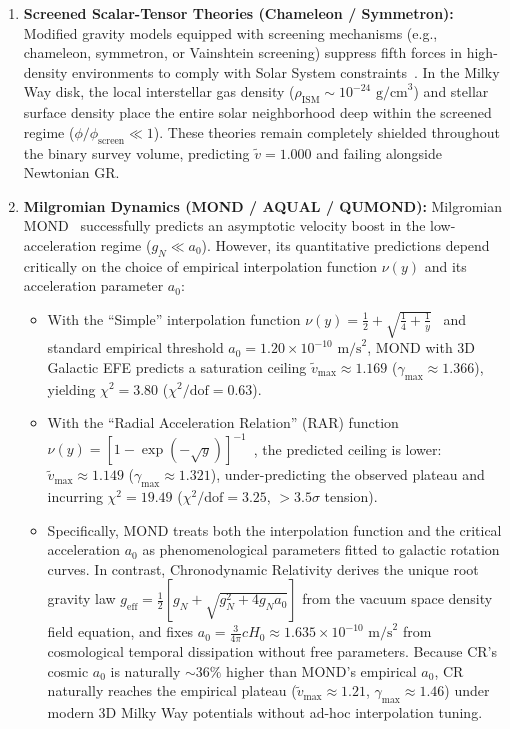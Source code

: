 \documentclass[aps,prd,reprint,superscriptaddress,nofootinbib,floatfix,amsmath,amssymb]{revtex4-2}
\begin{document}
\begin{enumerate}
\item \textbf{Screened Scalar-Tensor Theories (Chameleon / Symmetron):}
Modified gravity models equipped with screening mechanisms (e.g., chameleon, symmetron, or Vainshtein screening) suppress fifth forces in high-density environments to comply with Solar System constraints~\cite{clifton2012modified}. In the Milky Way disk, the local interstellar gas density ($\rho_{\text{ISM}} \sim 10^{-24}\text{ g/cm}^3$) and stellar surface density place the entire solar neighborhood deep within the screened regime ($\phi / \phi_{\text{screen}} \ll 1$). These theories remain completely shielded throughout the binary survey volume, predicting $\tilde{v} = 1.000$ and failing alongside Newtonian GR.

\item \textbf{Milgromian Dynamics (MOND / AQUAL / QUMOND):}
Milgromian MOND~\cite{milgrom1983modification} successfully predicts an asymptotic velocity boost in the low-acceleration regime ($g_N \ll a_0$). However, its quantitative predictions depend critically on the choice of empirical interpolation function $\nu(y)$ and its acceleration parameter $a_0$:
\begin{itemize}
\item With the ``Simple'' interpolation function $\nu(y) = \frac{1}{2} + \sqrt{\frac{1}{4} + \frac{1}{y}}$~\cite{famaey2005modified} and standard empirical threshold $a_0 = 1.20 \times 10^{-10}\text{ m/s}^2$, MOND with 3D Galactic EFE predicts a saturation ceiling $\tilde{v}_{\text{max}} \approx 1.169$ ($\gamma_{\text{max}} \approx 1.366$), yielding $\chi^2 = 3.80$ ($\chi^2/\text{dof} = 0.63$).
\item With the ``Radial Acceleration Relation'' (RAR) function $\nu(y) = [1 - \exp(-\sqrt{y})]^{-1}$~\cite{mcgaugh2016radial}, the predicted ceiling is lower: $\tilde{v}_{\text{max}} \approx 1.149$ ($\gamma_{\text{max}} \approx 1.321$), under-predicting the observed plateau and incurring $\chi^2 = 19.49$ ($\chi^2/\text{dof} = 3.25$, $>3.5\sigma$ tension).
\item Specifically, MOND treats both the interpolation function and the critical acceleration $a_0$ as phenomenological parameters fitted to galactic rotation curves. In contrast, Chronodynamic Relativity derives the unique root gravity law $g_{\text{eff}} = \frac{1}{2}[g_N + \sqrt{g_N^2 + 4 g_N a_0}]$ from the vacuum space density field equation, and fixes $a_0 = \frac{3}{4\pi} c H_0 \approx 1.635 \times 10^{-10}\text{ m/s}^2$ from cosmological temporal dissipation without free parameters. Because CR's cosmic $a_0$ is naturally $\sim 36\%$ higher than MOND's empirical $a_0$, CR naturally reaches the empirical plateau ($\tilde{v}_{\text{max}} \approx 1.21$, $\gamma_{\text{max}} \approx 1.46$) under modern 3D Milky Way potentials without ad-hoc interpolation tuning.
\end{itemize}
\end{enumerate}
\end{document}
